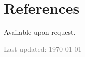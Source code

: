 \documentclass[11pt,a4paper,sans]{moderncv}
\begin{document}
\section{ References}

Available upon request.

\vfill
\begin{center}
    \small\textcolor{gray}{Last updated: \today}
\end{center}
\end{document}
